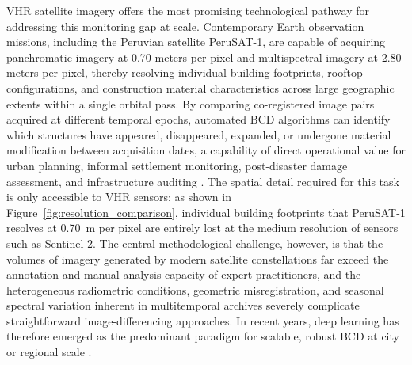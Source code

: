 \ac{VHR} satellite imagery offers the most promising technological pathway for addressing this monitoring gap at scale. Contemporary Earth observation missions, including the Peruvian satellite PeruSAT-1, are capable of acquiring panchromatic imagery at 0.70 meters per pixel and multispectral imagery at 2.80 meters per pixel, thereby resolving individual building footprints, rooftop configurations, and construction material characteristics across large geographic extents within a single orbital pass. By comparing co-registered image pairs acquired at different temporal epochs, automated \ac{BCD} algorithms can identify which structures have appeared, disappeared, expanded, or undergone material modification between acquisition dates, a capability of direct operational value for urban planning, informal settlement monitoring, post-disaster damage assessment, and infrastructure auditing \cite{Cheng2021DeepLab, Sirko2023TeachStudentSentinel2}. The spatial detail required for this task is only accessible to \ac{VHR} sensors: as shown in Figure~\ref{fig:resolution_comparison}, individual building footprints that PeruSAT-1 resolves at 0.70~m per pixel are entirely lost at the medium resolution of sensors such as Sentinel-2. The central methodological challenge, however, is that the volumes of imagery generated by modern satellite constellations far exceed the annotation and manual analysis capacity of expert practitioners, and the heterogeneous radiometric conditions, geometric misregistration, and seasonal spectral variation inherent in multitemporal archives severely complicate straightforward image-differencing approaches. In recent years, deep learning has therefore emerged as the predominant paradigm for scalable, robust \ac{BCD} at city or regional scale \cite{Sirko2023TeachStudentSentinel2, Cheng2021DeepLab}.

